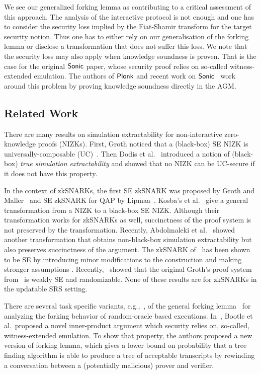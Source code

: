 We see our generalized forking lemma as contributing to a critical assessment of
this approach. The analysis of the interactive protocol is not enough and one
has to consider the security loss implied by the Fiat-Shamir transform for the target security notion. Thus one has to either rely on our generalisation of the forking
lemma or disclose a transformation that does not suffer this loss. We note that
the security loss may also apply when knowledge soundness is proven. That is the
case for the original ${\textnormal{\textsf{Sonic}}}$ paper, whose security proof relies on so-called witness-extended
emulation. The authors of $\textnormal{\textsf{Plonk}}$ and recent work on ${\textnormal{\textsf{Sonic}}}$~\cite{cryptoeprint:2020:1351} work around this problem by proving
knowledge soundness directly in the AGM.



\subsection{Related Work}
 

There are many results on simulation extractability for
non-interactive zero-knowledge proofs (NIZKs). First, Groth \cite{AC:Groth07}
noticed that a (black-box) SE NIZK is
universally-composable (UC)~\cite{EPRINT:Canetti00}. Then Dodis et al.~\cite{AC:DHLW10} introduced a
notion of (black-box) \emph{true simulation extractability} and showed that no
NIZK can be UC-secure if it does not have this property. 

In the context of zkSNARKs, the first
SE zkSNARK was proposed by Groth and Maller~\cite{C:GroMal17} and SE
zkSNARK for QAP by Lipmaa~\cite{EPRINT:Lipmaa19a}. 
Kosba's et
al.~\cite{EPRINT:KZMQCP15} give a general transformation from a NIZK to a
black-box SE NIZK. Although their transformation works for zkSNARKs as well,
succinctness of the proof system is not preserved by the transformation.
Recently, Abdolmaleki et al.~\cite{CCS:AbdRamSla20} showed another transformation that
obtains non-black-box simulation extractability but also preserves
succinctness of the argument. 
The zkSNARK of~\cite{EC:Groth16} has been shown to be SE by introducing minor modifications to the construction and making
stronger assumptions \cite{EPRINT:BowGab18,EPRINT:AtaBag19}. Recently,~\cite{EPRINT:BKSV20} showed that the
original Groth's proof system from~\cite{EC:Groth16} is weakly SE and
randomizable. None of these results are for zkSNARKs in the updatable SRS setting.

There are several task specific variants, e.g.,~\cite{INDOCRYPT:HerSae03,CCS:BagCheJar08,AC:BelDaiLi19}, of the general forking lemma~\cite{JC:PoiSte00,CCS:BelNev06} for analyzing the forking behavior of random-oracle based executions.
In~\cite{EC:BCCGP16}, Bootle et al.~proposed a novel inner-product argument which
security relies on, so-called, witness-extended emulation. To show that
property, the authors proposed a new version of forking lemma, which gives a
lower bound on probability that a tree finding algorithm is able to produce a 
tree of acceptable transcripts by rewinding a conversation between a
(potentially malicious) prover and verifier.

